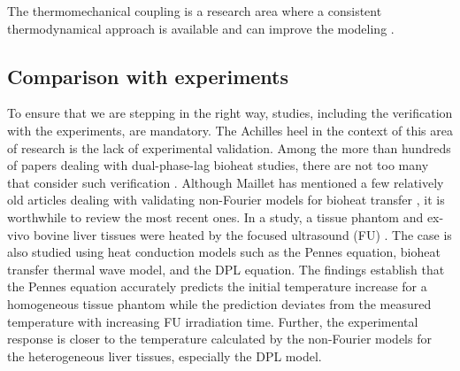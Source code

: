 \documentclass[sn-mathphys]{sn-jnl}%
\theoremstyle{thmstyleone}%
\theoremstyle{thmstyletwo}%
\theoremstyle{thmstylethree}%
\begin{document}
{{ The thermomechanical coupling is a research area where a consistent thermodynamical approach is available and can improve the modeling \cite{BerVan17b,JozsKov20b}}.

\subsection{Comparison with experiments}
To ensure that we are stepping in the right way, studies, including the verification with the experiments, are mandatory. The Achilles heel in the context of this area of research is the lack of experimental validation. Among the more than hundreds of papers dealing with dual-phase-lag bioheat studies, there are not too many that consider such verification \cite{Phadnis2016, Sahoo2018,APaul20201,YYin2020,Hooshmand20151,Alzahrani2019}. Although Maillet has mentioned a few relatively old articles dealing with validating non-Fourier models for bioheat transfer \cite{Mail2019}, it is worthwhile to review the most recent ones. In a study, a tissue phantom and ex-vivo bovine liver tissues were heated by the focused ultrasound (FU) \cite{CLi2018}. The case is also studied using heat conduction models such as the Pennes equation, bioheat transfer thermal wave model, and the DPL equation. The findings establish that the Pennes equation accurately predicts the initial temperature increase for a homogeneous tissue phantom while the prediction deviates from the measured temperature with increasing FU irradiation time. Further, the experimental response is closer to the temperature calculated by the non-Fourier models for the heterogeneous liver tissues, especially the DPL model.
}
\end{document}
